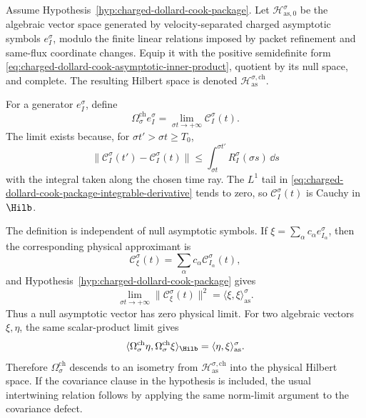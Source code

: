 \begin{construction}
\label{cons:charged-dollard-cook-wave-maps}
Assume Hypothesis~\ref{hyp:charged-dollard-cook-package}.  Let
\(\mathcal H_{\mathrm{as},0}^{\sigma}\) be the algebraic vector space
generated by velocity-separated charged asymptotic symbols \(e_I^\sigma\),
modulo the finite linear relations imposed by packet refinement and same-flux
coordinate changes.  Equip it with the positive semidefinite form
\eqref{eq:charged-dollard-cook-asymptotic-inner-product}, quotient by its
null space, and complete.  The resulting Hilbert space is denoted
\(\mathcal H_{\mathrm{as}}^{\sigma,\mathrm{ch}}\).

For a generator \(e_I^\sigma\), define
\begin{equation}
  \Omega_{\sigma}^{\mathrm{ch}} e_I^\sigma
  =
  \lim_{\sigma t\to+\infty}\mathcal C_I^\sigma(t).
  \label{eq:charged-dollard-cook-wave-map-definition}
\end{equation}
The limit exists because, for \(\sigma t'>\sigma t\ge T_0\),
\[
  \|\mathcal C_I^\sigma(t')-\mathcal C_I^\sigma(t)\|
  \le
  \int_{\sigma t}^{\sigma t'}R_I^\sigma(\sigma s)\,\dd s
\]
with the integral taken along the chosen time ray.  The \(L^1\) tail in
\eqref{eq:charged-dollard-cook-package-integrable-derivative} tends to zero,
so \(\mathcal C_I^\sigma(t)\) is Cauchy in \(\Hilb\).

The definition is independent of null asymptotic symbols.  If
\(\xi=\sum_\alpha c_\alpha e_{I_\alpha}^\sigma\), then the corresponding
physical approximant is
\[
  \mathcal C_\xi^\sigma(t)
  =
  \sum_\alpha c_\alpha\mathcal C_{I_\alpha}^\sigma(t),
\]
and Hypothesis~\ref{hyp:charged-dollard-cook-package} gives
\begin{equation}
  \lim_{\sigma t\to+\infty}\|\mathcal C_\xi^\sigma(t)\|^2
  =
  \langle \xi,\xi\rangle_{\mathrm{as}}^\sigma .
  \label{eq:charged-dollard-cook-null-vector-check}
\end{equation}
Thus a null asymptotic vector has zero physical limit.  For two algebraic
vectors \(\xi,\eta\), the same scalar-product limit gives
\[
  \langle
    \Omega_\sigma^{\mathrm{ch}}\eta,
    \Omega_\sigma^{\mathrm{ch}}\xi
  \rangle_{\Hilb}
  =
  \langle\eta,\xi\rangle_{\mathrm{as}}^\sigma .
\]
Therefore \(\Omega_\sigma^{\mathrm{ch}}\) descends to an isometry from
\(\mathcal H_{\mathrm{as}}^{\sigma,\mathrm{ch}}\) into the physical Hilbert
space.  If the covariance clause in the hypothesis is included, the usual
intertwining relation follows by applying the same norm-limit argument to the
covariance defect.
\end{construction}

